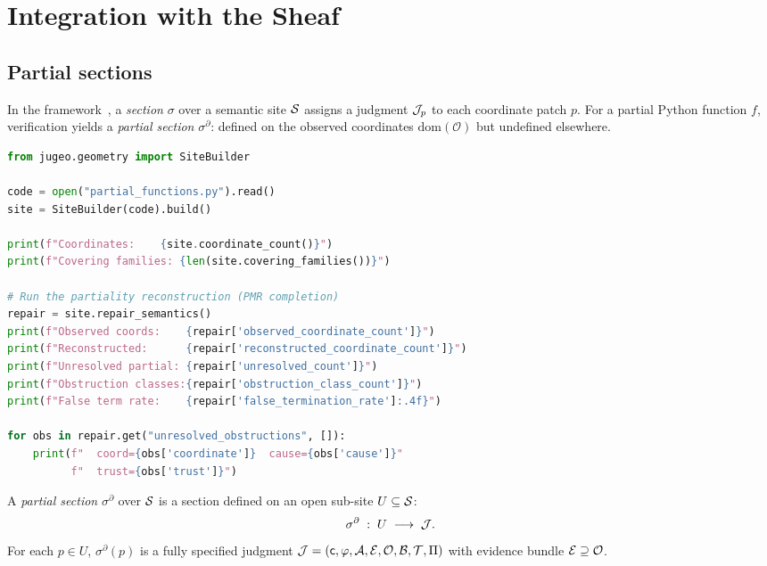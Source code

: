 \documentclass[11pt]{article}
\newcommand{\pdom}{\mathrm{dom}}             %
\newcommand{\ObsSet}{\mathcal{O}}          %
\newcommand{\PartSec}{\sigma^{\partial}}   %
\begin{document}
\section{Integration with the \JuGeo{} Sheaf}\label{sec:sheaf}

\subsection{Partial sections}

In the \JuGeo{} framework~\cite{jugeo01}, a \emph{section} $\sigma$
over a semantic site $\mathcal{S}$ assigns a judgment $\mathcal{J}_p$ to each
coordinate patch $p$.  For a partial Python function $f$, verification
yields a \emph{partial section} $\PartSec$: defined on the observed
coordinates $\pdom(\ObsSet)$ but undefined elsewhere.

\begin{lstlisting}[language=Python, caption={Using the \JuGeo{} repair semantics API to reconstruct a partial section over a site.}]
from jugeo.geometry import SiteBuilder

code = open("partial_functions.py").read()
site = SiteBuilder(code).build()

print(f"Coordinates:    {site.coordinate_count()}")
print(f"Covering families: {len(site.covering_families())}")

# Run the partiality reconstruction (PMR completion)
repair = site.repair_semantics()
print(f"Observed coords:    {repair['observed_coordinate_count']}")
print(f"Reconstructed:      {repair['reconstructed_coordinate_count']}")
print(f"Unresolved partial: {repair['unresolved_count']}")
print(f"Obstruction classes:{repair['obstruction_class_count']}")
print(f"False term rate:    {repair['false_termination_rate']:.4f}")

for obs in repair.get("unresolved_obstructions", []):
    print(f"  coord={obs['coordinate']}  cause={obs['cause']}"
          f"  trust={obs['trust']}")
\end{lstlisting}

\begin{definition}\label{def:part-sec}
A \emph{partial section} $\PartSec$ over $\mathcal{S}$ is a section defined
on an open sub-site $U \subseteq \mathcal{S}$:
\[
  \PartSec \;:\; U \;\longrightarrow\; \J.
\]
For each $p \in U$, $\PartSec(p)$ is a fully specified judgment
$\mathcal{J} = (\mathsf{c}, \varphi, \mathcal{A}, \mathcal{E}, \mathcal{O}, \mathcal{B}, \mathcal{T}, \Pi)$
with evidence bundle $\evid \supseteq \ObsSet$.
\end{definition}
\end{document}
